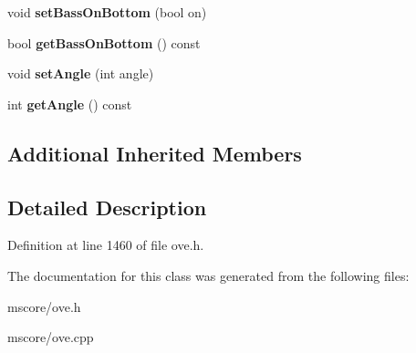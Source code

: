 \begin{DoxyCompactItemize}
\item 
\mbox{\label{class_o_v_e_1_1_harmony_aeb5a064f6d8e8ec4c1c5aa6fed59cd9a}} 
void {\bfseries set\+Bass\+On\+Bottom} (bool on)
\item 
\mbox{\label{class_o_v_e_1_1_harmony_a315576af15d69e0a39d83ae64aea5592}} 
bool {\bfseries get\+Bass\+On\+Bottom} () const
\item 
\mbox{\label{class_o_v_e_1_1_harmony_a796648594c23aebc93120833dd12f099}} 
void {\bfseries set\+Angle} (int angle)
\item 
\mbox{\label{class_o_v_e_1_1_harmony_a9fc05e1bf858ac82ab0144d87409d274}} 
int {\bfseries get\+Angle} () const
\end{DoxyCompactItemize}
\subsection*{Additional Inherited Members}


\subsection{Detailed Description}


Definition at line 1460 of file ove.\+h.



The documentation for this class was generated from the following files\+:\begin{DoxyCompactItemize}
\item 
mscore/ove.\+h\item 
mscore/ove.\+cpp\end{DoxyCompactItemize}
